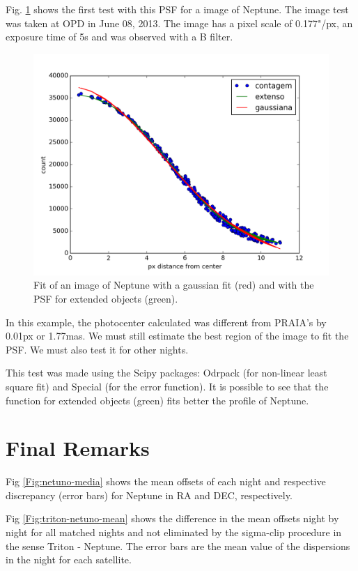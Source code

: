 \documentclass[12pt,a4paper]{report}
\begin{document}
Fig. \ref{Fig:ajuste-psf} shows the first test with this PSF for a image of Neptune. The image test was taken at OPD in June 08, 2013. The image has a pixel scale of 0.177"/px, an exposure time of 5s and was observed with a B filter.

\begin{figure}
\includegraphics[width=16cm]{Ajuste.png} 
\caption{Fit of an image of Neptune with a gaussian fit (red) and with the PSF for extended objects (green).\label{Fig:ajuste-psf}}
\end{figure}

In this example, the photocenter calculated was different from PRAIA's by 0.01px or 1.77mas. We must still estimate the best region of the image to fit the PSF. We must also test it for other nights.

This test was made using the Scipy packages: Odrpack (for non-linear least square fit) and Special (for the error function). It is possible to see that the function for extended objects (green) fits better the profile of Neptune.

\section*{Final Remarks}

Fig \ref{Fig:netuno-media} shows the mean offsets of each night and respective discrepancy (error bars) for Neptune in RA and DEC, respectively.

Fig \ref{Fig:triton-netuno-mean} shows the difference in the mean offsets night by night for all matched nights and not eliminated by the sigma-clip procedure in the sense Triton - Neptune. The error bars are the mean value of the dispersions in the night for each satellite.
\end{document}
